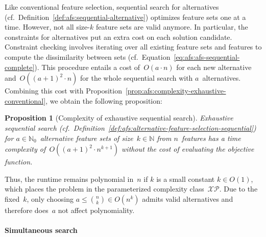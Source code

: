 \documentclass{article}
\newtheorem{proposition}{Proposition}
\theoremstyle{definition}
\begin{document}
Like conventional feature selection, sequential search for alternatives (cf.~Definition~\ref{def:afs:sequential-alternative}) optimizes feature sets one at a time.
However, not all size-$k$ feature sets are valid anymore.
In particular, the constraints for alternatives put an extra cost on each solution candidate.
Constraint checking involves iterating over all existing feature sets and features to compute the dissimilarity between sets (cf.~Equation~\ref{eq:afs:afs-sequential-complete}).
This procedure entails a cost of~$O(a \cdot n)$ for each new alternative and~$O((a+1)^2 \cdot n)$ for the whole sequential search with $a$~alternatives.
Combining this cost with Proposition~\ref{prop:afs:complexity-exhaustive-conventional}, we obtain the following proposition:
%
\begin{proposition}[Complexity of exhaustive sequential search]
	Exhaustive sequential search (cf.~Definition~\ref{def:afs:alternative-feature-selection-sequential}) for $a \in \mathbb{N}_0$~alternative feature sets of size~$k \in \mathbb{N}$ from $n$~features has a time complexity of~$O((a+1)^2 \cdot n^{k+1})$ without the cost of evaluating the objective function.
	\label{prop:afs:complexity-exhaustive-sequential}
\end{proposition}
%
Thus, the runtime remains polynomial in~$n$ if $k$ is a small constant $k \in O(1)$, which places the problem in the parameterized complexity class~$\mathcal{XP}$.
Due to the fixed~$k$, only choosing $a \leq \binom{n}{k} \in O(n^k)$ admits valid alternatives and therefore does~$a$ not affect polynomiality.

\paragraph{Simultaneous search}
\end{document}
